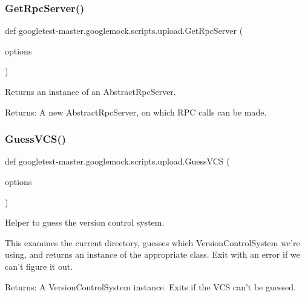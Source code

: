 \subsubsection{\texorpdfstring{GetRpcServer()}{GetRpcServer()}}
{\footnotesize\ttfamily def googletest-\/master.\+googlemock.\+scripts.\+upload.\+Get\+Rpc\+Server (\begin{DoxyParamCaption}\item[{}]{options }\end{DoxyParamCaption})}

\begin{DoxyVerb}Returns an instance of an AbstractRpcServer.

Returns:
  A new AbstractRpcServer, on which RPC calls can be made.
\end{DoxyVerb}
 \mbox{\label{namespacegoogletest-master_1_1googlemock_1_1scripts_1_1upload_ac5380104609bd9c97ec5e0779c9a3b75}} 
\subsubsection{\texorpdfstring{GuessVCS()}{GuessVCS()}}
{\footnotesize\ttfamily def googletest-\/master.\+googlemock.\+scripts.\+upload.\+Guess\+V\+CS (\begin{DoxyParamCaption}\item[{}]{options }\end{DoxyParamCaption})}

\begin{DoxyVerb}Helper to guess the version control system.

This examines the current directory, guesses which VersionControlSystem
we're using, and returns an instance of the appropriate class.  Exit with an
error if we can't figure it out.

Returns:
  A VersionControlSystem instance. Exits if the VCS can't be guessed.
\end{DoxyVerb}
 \mbox{\label{namespacegoogletest-master_1_1googlemock_1_1scripts_1_1upload_a63d1ccb407218a15aacb6b04e4f1ce9e}} 
